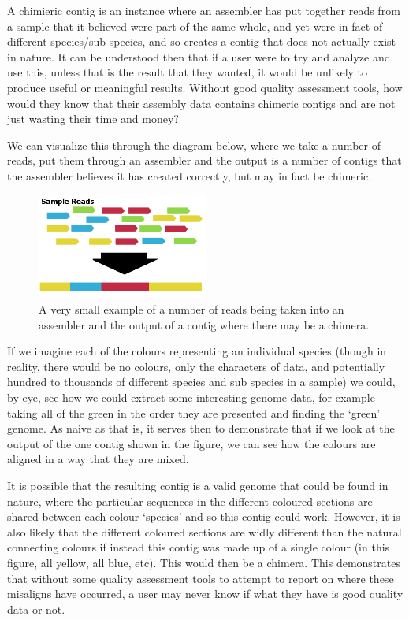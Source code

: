A chimieric contig is an instance where an assembler has put together reads from a sample that it believed were part of the same whole, and yet were in fact of different species/sub-species, and so creates a contig that does not actually exist in nature. It can be understood then that if a user were to try and analyze and use this, unless that is the result that they wanted, it would be unlikely to produce useful or meaningful results. Without good quality assessment tools, how would they know that their assembly data contains chimeric contigs and are not just wasting their time and money?

We can visualize this through  the diagram below, where we take a number of reads, put them through an assembler and the output is a number of contigs that the assembler believes it has created correctly, but may in fact be chimeric.

\begin{figure}[H]
	\centering
\includegraphics[width=0.5\textwidth]{images/basicmetaassembly}
	\caption{A very small example of a number of reads being taken into an assembler and the output of a contig where there may be a chimera.}
\end{figure}

If we imagine each of the colours representing an individual species (though in reality, there would be no colours, only the characters of data, and potentially hundred to thousands of different species and sub species in a sample) we could, by eye, see how we could extract some interesting genome data, for example taking all of the green in the order they are presented and finding the `green' genome. As naive as that is, it serves then to demonstrate that if we look at the output of the one contig shown in the figure, we can see how the  colours are aligned in a way that they are mixed.

It is possible that the resulting contig is a valid genome that could be found in nature, where the particular sequences in the different coloured sections are shared between each colour `species' and so this contig could work. However, it is also likely that the different coloured sections are widly different than the natural connecting colours if instead this contig was made up of a single colour (in this figure, all yellow, all blue, etc). This would then be a chimera. This demonstrates that without some quality assessment tools to attempt to report on where these misaligns have occurred, a user may never know if what they have is good quality data or not.

